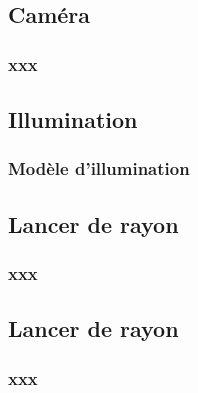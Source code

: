 \subsection{Caméra}
\subsubsection{xxx}

\subsection{Illumination}
\subsubsection{Modèle d'illumination}
\label{s:illumination}

%

\subsection{Lancer de rayon}
\subsubsection{xxx}

\subsection{Lancer de rayon}
\subsubsection{xxx}

